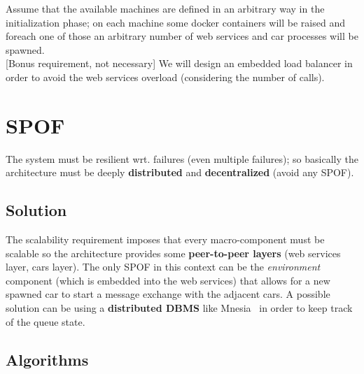 Assume that the available machines are defined in an arbitrary 
way in the initialization phase; on each machine some docker containers 
will be raised and foreach one of those an arbitrary number of web services and 
car processes will be spawned.\\


[Bonus requirement, not necessary]
We will design an embedded load balancer in order to avoid the web services overload 
(considering the number of calls).



\section{SPOF}

The system must be resilient wrt. failures (even multiple failures);
so basically the architecture must be deeply \textbf{distributed} 
and \textbf{decentralized} (avoid any SPOF). 


\subsection{Solution}

The scalability requirement imposes that every macro-component must be scalable 
so the architecture provides some \textbf{peer-to-peer layers} 
(web services layer, cars layer).
The only SPOF in this context can be the \textit{environment} component 
(which is embedded into the web services) that allows for a new spawned car to 
start a message exchange with the adjacent cars. 
A possible solution can be using a \textbf{distributed DBMS} like Mnesia~\cite{1} in order to keep 
track of the queue state.

%
%


\subsection{Algorithms}

